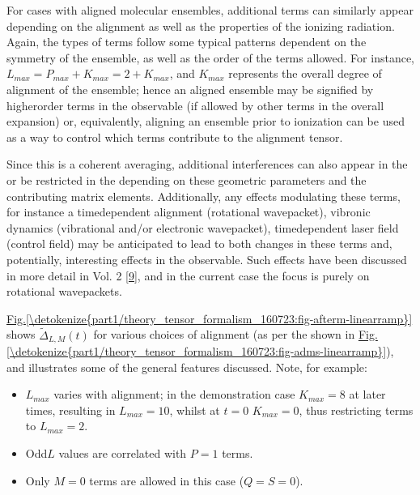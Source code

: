 \documentclass[letterpaper,table,10pt,english]{jupyterBook}
\begin{document}
\sphinxAtStartPar
For cases with aligned molecular ensembles, additional terms can similarly appear depending on the alignment as well as the properties of the ionizing radiation. Again, the types of terms follow some typical patterns dependent on the symmetry of the ensemble, as well as the order of the terms allowed. For instance, \(L_{max}=P_{max}+K_{max}=2+K_{max}\), and \(K_{max}\) represents the overall degree of alignment of the ensemble; hence an aligned ensemble may be signified by higher\sphinxhyphen{}order terms in the observable (if allowed by other terms in the overall expansion) or, equivalently, aligning an ensemble prior to ionization can be used as a way to control which terms contribute to the alignment tensor.

\sphinxAtStartPar
Since this is a coherent averaging, additional interferences can also appear in the {\hyperref[\detokenize{backmatter/glossary:term-AF}]{}} \sphinxhyphen{} or be restricted in the {\hyperref[\detokenize{backmatter/glossary:term-AF}]{}} \sphinxhyphen{} depending on these geometric parameters and the contributing matrix elements. Additionally, any effects modulating these terms, for instance a time\sphinxhyphen{}dependent alignment (rotational wavepacket), vibronic dynamics (vibrational and/or electronic wavepacket), time\sphinxhyphen{}dependent laser field (control field) may be anticipated to lead to both changes in these terms and, potentially, interesting effects in the observable. Such effects have been discussed in more detail in  Vol. 2 {[}\hyperlink{cite.backmatter/bibliography:id678}{9}{]}, and in the current case the focus is purely on rotational wavepackets.

\sphinxAtStartPar
\hyperref[\detokenize{part1/theory_tensor_formalism_160723:fig-afterm-linearramp}]{Fig.\@ \ref{\detokenize{part1/theory_tensor_formalism_160723:fig-afterm-linearramp}}} shows \(\tilde{\Delta}_{L,M}(t)\) for various choices of alignment (as per the {\hyperref[\detokenize{backmatter/glossary:term-ADMs}]{}} shown in \hyperref[\detokenize{part1/theory_tensor_formalism_160723:fig-adms-linearramp}]{Fig.\@ \ref{\detokenize{part1/theory_tensor_formalism_160723:fig-adms-linearramp}}}), and illustrates some of the general features discussed. Note, for example:
\begin{itemize}
\item {} 
\sphinxAtStartPar
\(L_{max}\) varies with alignment; in the demonstration case \(K_{max}=8\) at later times, resulting in \(L_{max}=10\), whilst at \(t=0\) \(K_{max}=0\), thus restricting terms to \(L_{max}=2\).

\item {} 
\sphinxAtStartPar
Odd\sphinxhyphen{}\(L\) values are correlated with \(P=1\) terms.

\item {} 
\sphinxAtStartPar
Only \(M=0\) terms are allowed in this case (\(Q=S=0\)).

\end{itemize}
\end{document}
